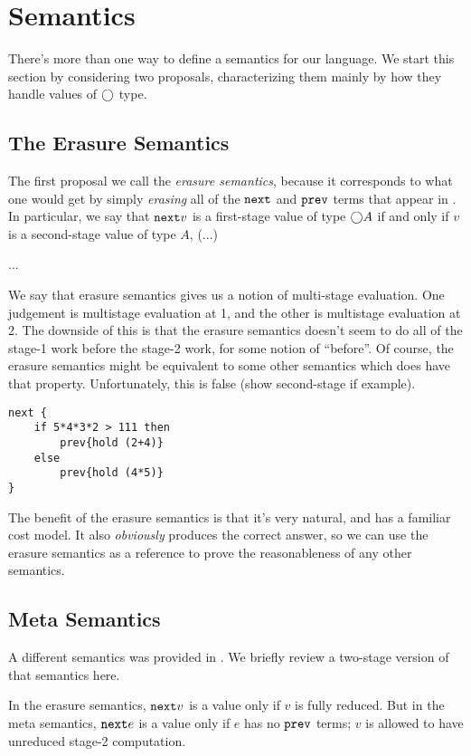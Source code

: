 
\section{Semantics}

There's more than one way to define a semantics for our language.  We start this section by considering two proposals, characterizing them mainly by how they handle values of $\bigcirc$ type.

\subsection{The Erasure Semantics}

The first proposal we call the {\em erasure semantics}, because it corresponds to what one would get by simply {\em erasing} all of the ${\tt next}$ and ${\tt prev}$ terms that appear in \lamStaged.  In particular, we say that ${\tt next} v$ is a first-stage value of type $\bigcirc A$ if and only if $v$ is a second-stage value of type $A$, (...)

...

We say that erasure semantics gives us a notion of multi-stage evaluation.  One judgement is multistage evaluation at 1, and the other is multistage evaluation at 2.  The downside of this is that the erasure semantics doesn't seem to do all of the stage-1 work before the stage-2 work, for some notion of ``before''.  Of course, the erasure semantics might be equivalent to some other semantics which does have that property.  Unfortunately, this is false (show second-stage if example).

\begin{lstlisting} 
next {
	if 5*4*3*2 > 111 then
		prev{hold (2+4)}
	else
		prev{hold (4*5)}
}
\end{lstlisting}

The benefit of the erasure semantics is that it's very natural, and has a familiar cost model.  It also {\em obviously} produces the correct answer, so we can use the erasure semantics as a reference to prove the reasonableness of any other semantics.

\subsection{Meta Semantics}

A different semantics was provided in \cite{davies96}.  We briefly review a two-stage version of that semantics here.

In the erasure semantics, ${\tt next} v$ is a value only if $v$ is fully reduced.  But in the meta semantics, ${\tt next} e$ is a value only if $e$ has no ${\tt prev}$ terms; $v$ is allowed to have unreduced stage-2 computation. 

